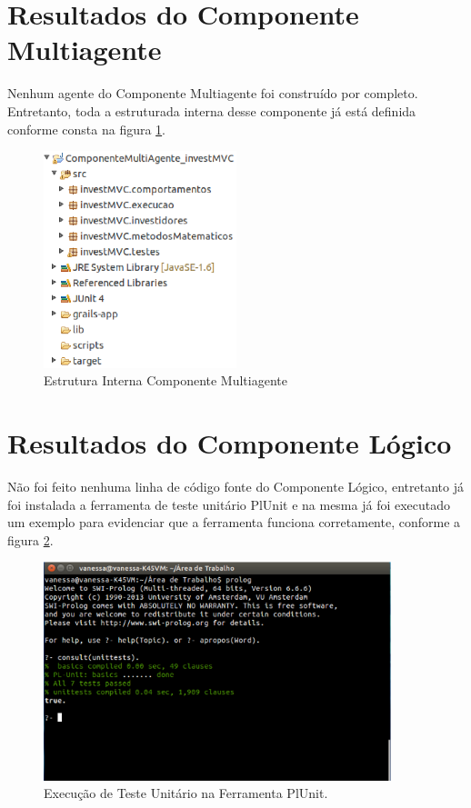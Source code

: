 \section{Resultados do Componente Multiagente}

Nenhum agente do Componente Multiagente foi construído por completo. Entretanto, toda a estruturada interna desse componente já está definida conforme consta na figura \ref{estruturaSMA}.

\begin{figure}[H]
\centering
\includegraphics[width=0.5\textwidth]{figuras/estruturaSMA}
\caption{ Estrutura Interna Componente Multiagente}
\label{estruturaSMA}
\end{figure}

\section{Resultados do Componente Lógico}

Não foi feito nenhuma linha de código fonte do Componente Lógico, entretanto já foi instalada a ferramenta de teste unitário PlUnit e na mesma já foi executado um exemplo para evidenciar que a ferramenta funciona corretamente, conforme a figura \ref{prologTests}.

\begin{figure}[H]
\centering
\includegraphics[width=0.9\textwidth]{figuras/prologTests}
\caption{Execução de Teste Unitário na Ferramenta PlUnit.}
\label{prologTests}
\end{figure}

